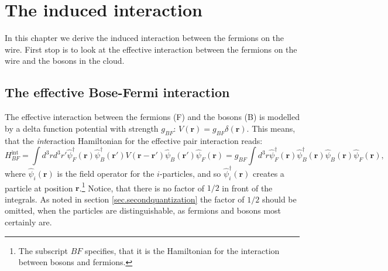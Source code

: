 
\chapter{The induced interaction} %

\label{Chapter3} %


In this chapter we derive the induced interaction between the fermions on the wire. First stop is to look at the effective interaction between the fermions on the wire and the bosons in the cloud.
\section{The effective Bose-Fermi interaction}
The effective interaction between the fermions (F) and the bosons (B) is modelled by a delta function potential with strength $g_{BF}$: $V(\mathbf{r})=g_{BF}\delta(\mathbf{r})$. This means, that the \textit{int}eraction Hamiltonian for the effective pair interaction reads:
\begin{equation}
H_{BF}^\text{int}  = \int d^3 r d^3 r' \hat{\psi}_F^\dagger(\mathbf{r}) \hat{\psi}_B^\dagger(\mathbf{r}')V(\mathbf{r}-\mathbf{r}')\hat{\psi}_B(\mathbf{r}')\hat{\psi}_F(\mathbf{r}) = g_{BF}\int d^3 r \hat{\psi}_F^\dagger(\mathbf{r}) \hat{\psi}_B^\dagger(\mathbf{r})\hat{\psi}_B(\mathbf{r})\hat{\psi}_F(\mathbf{r}),
\end{equation}
where $\hat{\psi}_i(\mathbf{r})$ is the field operator for the $i$-particles, and so $\hat{\psi}_i^\dagger(\mathbf{r})$ creates a particle at position $\mathbf{r}$.\footnote{The subscript $BF$ specifies, that it is the Hamiltonian for the interaction between bosons and fermions.} Notice, that there is no factor of $1/2$ in front of the integrals. As noted in section \ref{sec.secondquantization} the factor of $1/2$ should be omitted, when the particles are distinguishable, as fermions and bosons most certainly are. 

